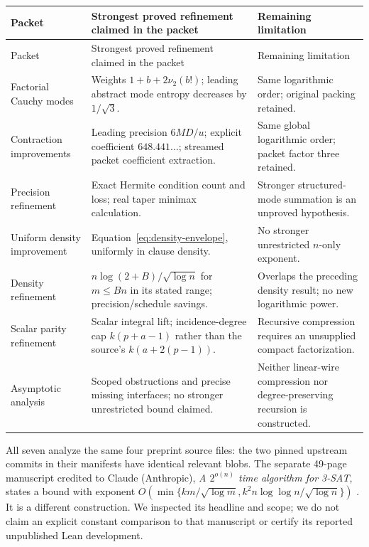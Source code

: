 \documentclass[11pt,letterpaper]{article}
\theoremstyle{remark}\newtheorem{remark}[theorem]{Remark}
\begin{document}
\begin{longtable}{@{}>{\raggedright\arraybackslash}p{}>{\raggedright\arraybackslash}p{}>{\raggedright\arraybackslash}p{}@{}}
\toprule
Packet & Strongest proved refinement claimed in the packet & Remaining limitation\\
\midrule\endfirsthead
\toprule Packet & Strongest proved refinement claimed in the packet & Remaining limitation\\\midrule\endhead
Factorial Cauchy modes \cite{cauchypacket} & Weights
$1+b+2\nu_2(b!)$; leading abstract mode entropy decreases by
$1/\sqrt3$. & Same logarithmic order; original packing retained.\\[5pt]
Contraction improvements \cite{contractionpacket} & Leading precision
$6MD/u$; explicit coefficient $648.441\ldots$; streamed packet
coefficient extraction. & Same global logarithmic order; packet factor
three retained.\\[5pt]
Precision refinement \cite{precisionpacket} & Exact Hermite condition
count and loss; real taper minimax calculation. & Stronger structured-mode
summation is an unproved hypothesis.\\[5pt]
Uniform density improvement \cite{densitypacket} &
Equation~\eqref{eq:density-envelope}, uniformly in clause density. &
No stronger unrestricted $n$-only exponent.\\[5pt]
Density refinement \cite{densityrefinement} &
$n\log(2+B)/\sqrt{\log n}$ for $m\le Bn$ in its stated range;
precision/schedule savings. & Overlaps the preceding density result;
no new logarithmic power.\\[5pt]
Scalar parity refinement \cite{scalarpacket} & Scalar integral lift;
incidence-degree cap $k(p+a-1)$ rather than the source's
$k(a+2(p-1))$. & Recursive compression requires an unsupplied compact
factorization.\\[5pt]
Asymptotic analysis \cite{barrierpacket} & Scoped obstructions and precise
missing interfaces; no stronger unrestricted bound claimed. & Neither
linear-wire compression nor degree-preserving recursion is constructed.\\
\bottomrule
\end{longtable}

All seven analyze the same four preprint source files: the two pinned
upstream commits in their manifests have identical relevant blobs.
The separate 49-page manuscript credited to Claude (Anthropic),
\emph{A $2^{o(n)}$ time algorithm for 3-SAT}, states a bound with exponent
$O(\min\{km/\sqrt{\log m},k^2n\log\log n/\sqrt{\log n}\})$
\cite{claudepaper}. It is a different construction. We inspected its
headline and scope; we do not claim an explicit constant comparison to
that manuscript or certify its reported unpublished Lean development.
\end{document}
